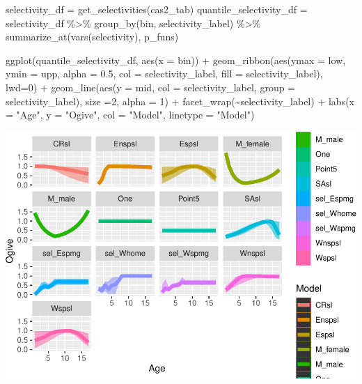 \documentclass[
]{book}
\newenvironment{Shaded}{\begin{snugshade}}{\end{snugshade}}
\newcommand{\AttributeTok}[1]{\textcolor[rgb]{0.77,0.63,0.00}{#1}}
\newcommand{\DecValTok}[1]{\textcolor[rgb]{0.00,0.00,0.81}{#1}}
\newcommand{\FloatTok}[1]{\textcolor[rgb]{0.00,0.00,0.81}{#1}}
\newcommand{\FunctionTok}[1]{\textcolor[rgb]{0.00,0.00,0.00}{#1}}
\newcommand{\NormalTok}[1]{#1}
\newcommand{\OtherTok}[1]{\textcolor[rgb]{0.56,0.35,0.01}{#1}}
\newcommand{\SpecialCharTok}[1]{\textcolor[rgb]{0.00,0.00,0.00}{#1}}
\newcommand{\StringTok}[1]{\textcolor[rgb]{0.31,0.60,0.02}{#1}}
\begin{document}
\begin{Shaded}
\begin{Highlighting}[]
\NormalTok{selectivity\_df }\OtherTok{=} \FunctionTok{get\_selectivities}\NormalTok{(cas2\_tab)}
\NormalTok{quantile\_selectivity\_df }\OtherTok{=}\NormalTok{ selectivity\_df }\SpecialCharTok{\%\textgreater{}\%} 
  \FunctionTok{group\_by}\NormalTok{(bin, selectivity\_label) }\SpecialCharTok{\%\textgreater{}\%} 
  \FunctionTok{summarize\_at}\NormalTok{(}\FunctionTok{vars}\NormalTok{(selectivity), p\_funs)}

\FunctionTok{ggplot}\NormalTok{(quantile\_selectivity\_df, }\FunctionTok{aes}\NormalTok{(}\AttributeTok{x =}\NormalTok{ bin)) }\SpecialCharTok{+}
  \FunctionTok{geom\_ribbon}\NormalTok{(}\FunctionTok{aes}\NormalTok{(}\AttributeTok{ymax  =}\NormalTok{ low, }\AttributeTok{ymin =}\NormalTok{ upp, }\AttributeTok{alpha =} \FloatTok{0.5}\NormalTok{, }\AttributeTok{col =}\NormalTok{ selectivity\_label, }\AttributeTok{fill =}\NormalTok{ selectivity\_label), }\AttributeTok{lwd=}\DecValTok{0}\NormalTok{) }\SpecialCharTok{+}
  \FunctionTok{geom\_line}\NormalTok{(}\FunctionTok{aes}\NormalTok{(}\AttributeTok{y =}\NormalTok{ mid, }\AttributeTok{col =}\NormalTok{ selectivity\_label, }\AttributeTok{group =}\NormalTok{ selectivity\_label), }\AttributeTok{size =}\DecValTok{2}\NormalTok{, }\AttributeTok{alpha =} \DecValTok{1}\NormalTok{) }\SpecialCharTok{+}
  \FunctionTok{facet\_wrap}\NormalTok{(}\SpecialCharTok{\textasciitilde{}}\NormalTok{selectivity\_label) }\SpecialCharTok{+}
  \FunctionTok{labs}\NormalTok{(}\AttributeTok{x =} \StringTok{"Age"}\NormalTok{, }\AttributeTok{y =} \StringTok{"Ogive"}\NormalTok{, }\AttributeTok{col =} \StringTok{"Model"}\NormalTok{, }\AttributeTok{linetype =} \StringTok{"Model"}\NormalTok{)}
\end{Highlighting}
\end{Shaded}

\includegraphics{_main_files/figure-latex/selectivities-1.pdf}
\end{document}
